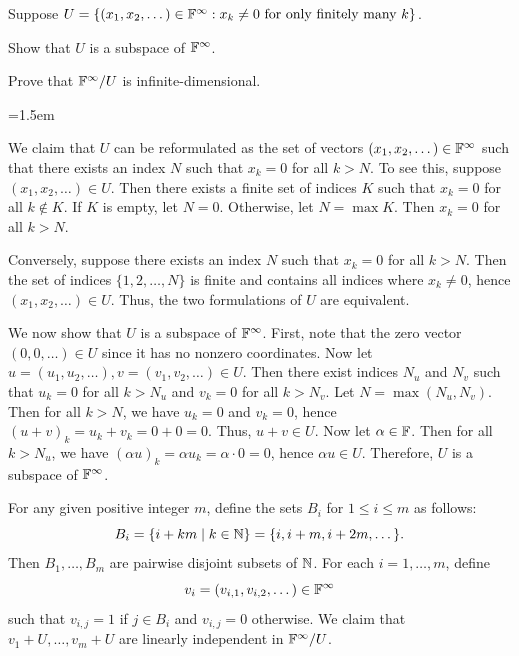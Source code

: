 \begin{exc}
\begin{exercise}
Suppose $U=\{(x_1,x_2,\dots)\in\mathbb{F}^\infty : x_k\ne0 \text{ for only finitely many
} k\}$.
\begin{parts}
\item Show that $U$ is a subspace of $\mathbb{F}^\infty$.
\item Prove that $\mathbb{F}^\infty/U$ is infinite-dimensional.
\end{parts}
\end{exercise}
\begin{solution}\emergencystretch=1.5em
\begin{parts}
\item We claim that $U$ can be reformulated as the set of vectors
  $(x_1,x_2,\dots)\in\mathbb{F}^\infty$ such that there exists an index $N$ such that
  $x_k=0$ for all $k>N$. To see this, suppose $(x_1,x_2,\dots)\in U$. Then there
  exists a finite set of indices $K$ such that $x_k=0$ for all $k\notin K$. If
  $K$ is empty, let $N=0$. Otherwise, let $N=\max K$. Then $x_k=0$ for all
  $k>N$.

  Conversely, suppose there exists an index $N$ such that $x_k=0$ for all
  $k>N$. Then the set of indices $\{1,2,\dots,N\}$ is finite and contains all
  indices where $x_k\ne0$, hence $(x_1,x_2,\dots)\in U$. Thus, the two
  formulations of $U$ are equivalent.

  We now show that $U$ is a subspace of $\mathbb{F}^\infty$. First, note that the zero
  vector $(0,0,\dots)\in U$ since it has no nonzero coordinates. Now let
  $u=(u_1,u_2,\dots),v=(v_1,v_2,\dots)\in U$. Then there exist indices $N_u$ and
  $N_v$ such that $u_k=0$ for all $k>N_u$ and $v_k=0$ for all $k>N_v$. Let
  $N=\max(N_u,N_v)$. Then for all $k>N$, we have $u_k=0$ and $v_k=0$, hence
  $(u+v)_k=u_k+v_k=0+0=0$. Thus, $u+v\in U$. Now let $\alpha\in\mathbb{F}$. Then for all
  $k>N_u$, we have $(\alpha u)_k=\alpha u_k=\alpha\cdot0=0$, hence
  $\alpha u\in U$. Therefore, $U$ is a subspace of $\mathbb{F}^\infty$.
\item For any given positive integer $m$, define the sets $B_i$ for
  $1\le i\le m$ as follows:
  \[ B_i = \{i+km \mid k\in\mathbb{N}\} = \{i,i+m,i+2m,\dots\}. \]
  Then $B_1,\dots,B_m$ are pairwise disjoint subsets of $\mathbb{N}$. For each
  $i=1,\dots,m$, define
  \[ v_i = (v_{i,1},v_{i,2},\dots)\in\mathbb{F}^\infty \]
  such that $v_{i,j}=1$ if $j\in B_i$ and $v_{i,j}=0$ otherwise. We claim that
  $v_1+U,\dots,v_m+U$ are linearly independent in $\mathbb{F}^\infty/U$.


\end{parts}
\end{solution}
\end{exc}
